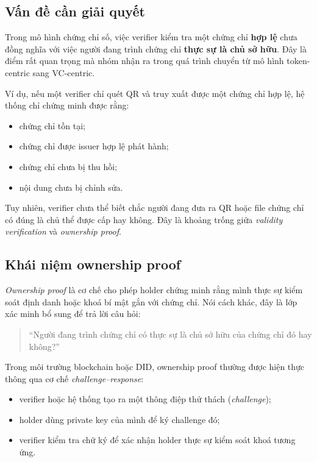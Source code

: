 \subsection{Vấn đề cần giải quyết}

Trong mô hình chứng chỉ số, việc verifier kiểm tra một chứng chỉ \textbf{hợp lệ} chưa đồng nghĩa với việc người đang trình chứng chỉ \textbf{thực sự là chủ sở hữu}. Đây là điểm rất quan trọng mà nhóm nhận ra trong quá trình chuyển từ mô hình token-centric sang VC-centric.

Ví dụ, nếu một verifier chỉ quét QR và truy xuất được một chứng chỉ hợp lệ, hệ thống chỉ chứng minh được rằng:
\begin{itemize}
    \item chứng chỉ tồn tại;
    \item chứng chỉ được issuer hợp lệ phát hành;
    \item chứng chỉ chưa bị thu hồi;
    \item nội dung chưa bị chỉnh sửa.
\end{itemize}

Tuy nhiên, verifier chưa thể biết chắc người đang đưa ra QR hoặc file chứng chỉ có đúng là chủ thể được cấp hay không. Đây là khoảng trống giữa \textit{validity verification} và \textit{ownership proof}.

\subsection{Khái niệm ownership proof}

\textit{Ownership proof} là cơ chế cho phép holder chứng minh rằng mình thực sự kiểm soát định danh hoặc khoá bí mật gắn với chứng chỉ. Nói cách khác, đây là lớp xác minh bổ sung để trả lời câu hỏi:
\begin{quote}
``Người đang trình chứng chỉ có thực sự là chủ sở hữu của chứng chỉ đó hay không?''
\end{quote}

Trong môi trường blockchain hoặc DID, ownership proof thường được hiện thực thông qua cơ chế \textit{challenge--response}:
\begin{itemize}
    \item verifier hoặc hệ thống tạo ra một thông điệp thử thách (\textit{challenge});
    \item holder dùng private key của mình để ký challenge đó;
    \item verifier kiểm tra chữ ký để xác nhận holder thực sự kiểm soát khoá tương ứng.
\end{itemize}

